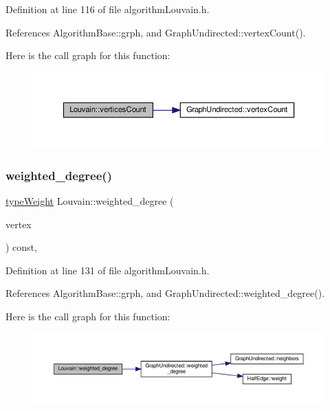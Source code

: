 Definition at line 116 of file algorithm\+Louvain.\+h.



References Algorithm\+Base\+::grph, and Graph\+Undirected\+::vertex\+Count().

Here is the call graph for this function\+:
\nopagebreak
\begin{figure}[H]
\begin{center}
\leavevmode
\includegraphics[width=350pt]{classLouvain_a714b788d8473834915ae23c05eb2bf29_cgraph}
\end{center}
\end{figure}
\mbox{\label{classLouvain_a55901b66258e0c727b8af1537846447b}} 
\subsubsection{\texorpdfstring{weighted\+\_\+degree()}{weighted\_degree()}}
{\footnotesize\ttfamily \hyperlink{edge_8h_a2e7ea3be891ac8b52f749ec73fee6dd2}{type\+Weight} Louvain\+::weighted\+\_\+degree (\begin{DoxyParamCaption}\item[{const \hyperlink{edge_8h_a5fbd20c46956d479cb10afc9855223f6}{type\+Vertex} \&}]{vertex }\end{DoxyParamCaption}) const\hspace{0.3cm}{\ttfamily [inline]}, {\ttfamily [private]}}



Definition at line 131 of file algorithm\+Louvain.\+h.



References Algorithm\+Base\+::grph, and Graph\+Undirected\+::weighted\+\_\+degree().

Here is the call graph for this function\+:
\nopagebreak
\begin{figure}[H]
\begin{center}
\leavevmode
\includegraphics[width=350pt]{classLouvain_a55901b66258e0c727b8af1537846447b_cgraph}
\end{center}
\end{figure}


